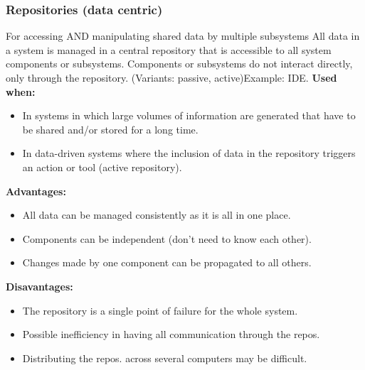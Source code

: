 \documentclass[../ESOF_notes.tex]{subfiles}
\begin{document}
\subsubsection{Repositories (data centric)}
For accessing AND manipulating shared data by multiple subsystems\newline\newline
All data in a system is managed in a central repository that is accessible to all system components or subsystems. Components or subsystems do not interact directly, only through the repository. (Variants: passive, active)\newline Example: IDE. \newline\newline
\textbf{Used when:}
\begin{itemize}
    \item In systems in which large volumes of information are generated that have to be shared and/or stored for a long time.
    \item In data-driven systems where the inclusion of data in the repository triggers an action or tool (active repository).
\end{itemize}
\textbf{Advantages:}
\begin{itemize}
    \item All data can be managed consistently as it is all in one place.
    \item Components can be independent (don’t need to know each other).
    \item Changes made by one component can be propagated to all others.
\end{itemize}
\textbf{Disavantages:}
\begin{itemize}
    \item The repository is a single point of failure for the whole system.
    \item Possible inefficiency in having all communication through the repos.
    \item Distributing the repos. across several computers may be difficult.
\end{itemize}
\end{document}
